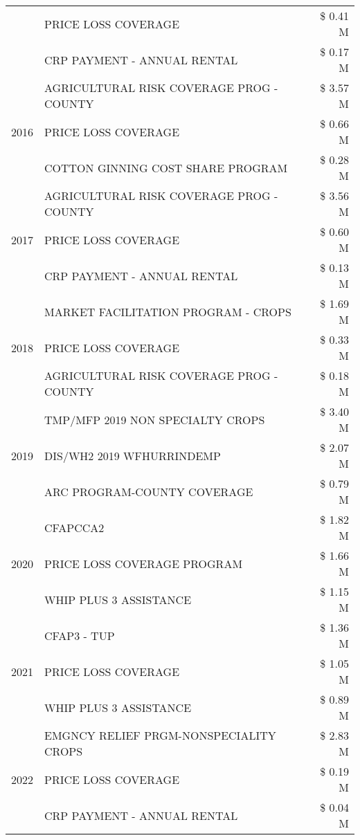 \begin{tabular}{llr}
 & PRICE LOSS COVERAGE & \$ 0.41 M \\
 & CRP PAYMENT - ANNUAL RENTAL & \$ 0.17 M \\
\cline{1-3}
\multirow[t]{3}{*}{2016} & AGRICULTURAL RISK COVERAGE PROG - COUNTY & \$ 3.57 M \\
 & PRICE LOSS COVERAGE & \$ 0.66 M \\
 & COTTON GINNING COST SHARE PROGRAM & \$ 0.28 M \\
\cline{1-3}
\multirow[t]{3}{*}{2017} & AGRICULTURAL RISK COVERAGE PROG - COUNTY & \$ 3.56 M \\
 & PRICE LOSS COVERAGE & \$ 0.60 M \\
 & CRP PAYMENT - ANNUAL RENTAL & \$ 0.13 M \\
\cline{1-3}
\multirow[t]{3}{*}{2018} & MARKET FACILITATION PROGRAM - CROPS & \$ 1.69 M \\
 & PRICE LOSS COVERAGE & \$ 0.33 M \\
 & AGRICULTURAL RISK COVERAGE PROG - COUNTY & \$ 0.18 M \\
\cline{1-3}
\multirow[t]{3}{*}{2019} & TMP/MFP 2019 NON SPECIALTY CROPS & \$ 3.40 M \\
 & DIS/WH2 2019 WFHURRINDEMP & \$ 2.07 M \\
 & ARC PROGRAM-COUNTY COVERAGE & \$ 0.79 M \\
\cline{1-3}
\multirow[t]{3}{*}{2020} & CFAPCCA2 & \$ 1.82 M \\
 & PRICE LOSS COVERAGE PROGRAM & \$ 1.66 M \\
 & WHIP PLUS 3 ASSISTANCE & \$ 1.15 M \\
\cline{1-3}
\multirow[t]{3}{*}{2021} & CFAP3 - TUP & \$ 1.36 M \\
 & PRICE LOSS COVERAGE & \$ 1.05 M \\
 & WHIP PLUS 3 ASSISTANCE & \$ 0.89 M \\
\cline{1-3}
\multirow[t]{3}{*}{2022} & EMGNCY RELIEF PRGM-NONSPECIALITY CROPS & \$ 2.83 M \\
 & PRICE LOSS COVERAGE & \$ 0.19 M \\
 & CRP PAYMENT - ANNUAL RENTAL & \$ 0.04 M \\
\cline{1-3}
\bottomrule
\end{tabular}
